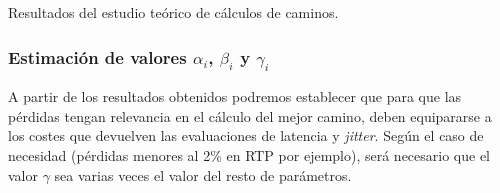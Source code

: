 \documentclass[a4paper,11pt]{book}
\begin{document}
\begin{itemize}
\begin{table}[htpb]
\caption{Resultados del estudio teórico de cálculos de caminos.}
\end{table}
\end{itemize}
\subsubsection{Estimación de valores $\alpha_i$, $\beta_i$ y  $\gamma_i$}

A partir de los resultados obtenidos podremos establecer que para que las pérdidas tengan relevancia en el cálculo del mejor camino, deben equipararse a los costes que devuelven las evaluaciones de latencia y \textit{jitter}. Según el caso de necesidad (pérdidas menores al 2\% en \ac{RTP} por ejemplo), será necesario que el valor $\gamma$ sea varias veces el valor del resto de parámetros.
\end{document}
